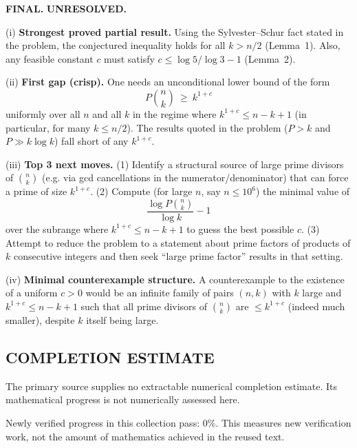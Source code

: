 \textbf{FINAL.}
\textbf{UNRESOLVED.}

(i) \textbf{Strongest proved partial result.}
Using the Sylvester--Schur fact stated in the problem, the conjectured inequality holds for all $k>n/2$ (Lemma~1). Also, any feasible constant $c$ must satisfy $c\le \log 5/\log 3 -1$ (Lemma~2).

(ii) \textbf{First gap (crisp).}
One needs an unconditional lower bound of the form
\[P\!\binom{n}{k}\ \ge\ k^{1+c}
\]
uniformly over all $n$ and all $k$ in the regime where $k^{1+c}\le n-k+1$ (in particular, for many $k\le n/2$). The results quoted in the problem ($P>k$ and $P\gg k\log k$) fall short of any $k^{1+c}$.

(iii) \textbf{Top 3 next moves.}
(1) Identify a structural source of large prime divisors of $\binom{n}{k}$ (e.g. via gcd cancellations in the numerator/denominator) that can force a prime of size $k^{1+c}$.
(2) Compute (for large $n$, say $n\le 10^6$) the minimal value of
\[\frac{\log P\!\binom{n}{k}}{\log k}-1
\]
over the subrange where $k^{1+c}\le n-k+1$ to guess the best possible $c$.
(3) Attempt to reduce the problem to a statement about prime factors of products of $k$ consecutive integers and then seek ``large prime factor'' results in that setting.

(iv) \textbf{Minimal counterexample structure.}
A counterexample to the existence of a uniform $c>0$ would be an infinite family of pairs $(n,k)$ with $k$ large and $k^{1+c}\le n-k+1$ such that all prime divisors of $\binom{n}{k}$ are $\le k^{1+c}$ (indeed much smaller), despite $k$ itself being large.




\subsection*{COMPLETION ESTIMATE}
The primary source supplies no extractable numerical completion estimate. Its mathematical progress is not numerically assessed here.

Newly verified progress in this collection pass: $0\%$. This measures new verification work, not the amount of mathematics achieved in the reused text.

